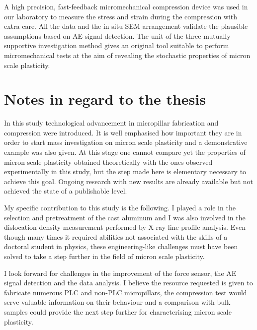 A high precision, fast-feedback micromechanical compression device was used in our laboratory to measure the stress and strain during the compression with extra care. All the data and the in situ SEM arrangement validate the plausible assumptions based on AE signal detection. The unit of the three mutually supportive investigation method gives an original tool suitable to perform micromechanical tests at the aim of revealing the stochastic properties of micron scale plasticity.

\section*{Notes in regard to the thesis}
In this study technological advancement in micropillar fabrication and compression were introduced. It is well emphasised how important they are in order to start mass investigation on micron scale plasticity and a demonstrative example was also given. At this stage one cannot compare yet the properties of micron scale plasticity obtained theoretically with the ones observed experimentally in this study, but the step made here is elementary necessary to achieve this goal. Ongoing research with new results are already available but not achieved the state of a publishable level.

My specific contribution to this study is the following. I played a role in the selection and pretreatment of the cast aluminum and I was also involved in the dislocation density measurement performed by X-ray line profile analysis. Even though many times it required abilities not associated with the skills of a doctoral student in physics, these engineering-like challenges must have been solved to take a step further in the field of micron scale plasticity.

I look forward for challenges in the improvement of the force sensor, the AE signal detection and the data analysis. I believe the resource requested is given to fabricate numerous PLC and non-PLC micropillars, the compression test would serve valuable information on their behaviour and a comparison with bulk samples could provide the next step further for characterising micron scale plasticity.

